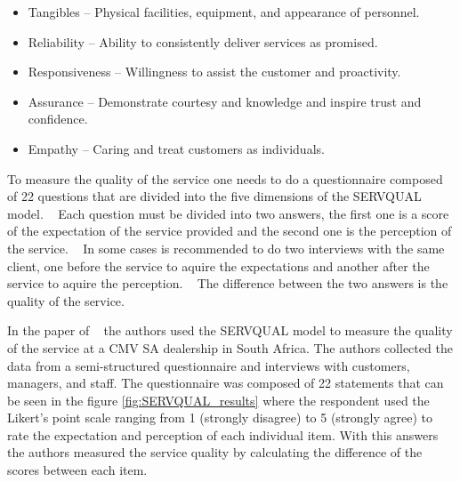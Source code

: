 \begin{itemize}
  \item Tangibles – Physical facilities, equipment, and appearance of personnel.
  \item Reliability – Ability to consistently deliver services as promised.
  \item Responsiveness – Willingness to assist the customer and proactivity.
  \item Assurance – Demonstrate courtesy and knowledge and inspire trust and confidence.
  \item Empathy – Caring and treat customers as individuals.
\end{itemize}

To measure the quality of the service one needs to do a questionnaire composed of 22 questions that are divided into the five dimensions of the SERVQUAL model. ~\cite{Measuring_After_sales_Service_Quality}
Each question must be divided into two answers, the first one is a score of the expectation of the service provided and the second one is the perception of the service. ~\cite{Measuring_After_sales_Service_Quality}
In some cases is recommended to do two interviews with the same client, one before the service to aquire the expectations and another after the service to aquire the perception. ~\cite{servqual_blog_da_qualidade}
The difference between the two answers is the quality of the service. ~\cite{servqual_blog_da_qualidade} ~\cite{Measuring_After_sales_Service_Quality} ~\cite{SERVQUAL_OLD}

In the paper of ~\cite{Measuring_After_sales_Service_Quality} the authors used the SERVQUAL model to measure the quality of the service at a CMV SA dealership in South Africa.
The authors collected the data from a semi-structured questionnaire and interviews with customers, managers, and staff.
The questionnaire was composed of 22 statements that can be seen in the figure \ref{fig:SERVQUAL_results} where the respondent used the Likert's point scale ranging from 1 (strongly disagree) to 5 (strongly agree) to rate the expectation and perception of each individual item.
With this answers the authors measured the service quality by calculating the difference of the scores between each item.
 
